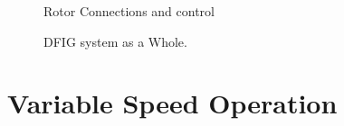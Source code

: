 \documentclass{beamer}
\begin{document}
\begin{frame}{}
       \begin{figure}
        \centering
        \caption{Rotor Connections and control}
    \end{figure}
\end{frame}

\begin{frame}{}
       \begin{figure}
        \centering
        \caption{DFIG system as a Whole.}
    \end{figure}
\end{frame}


\section{Variable Speed Operation}
\end{document}
